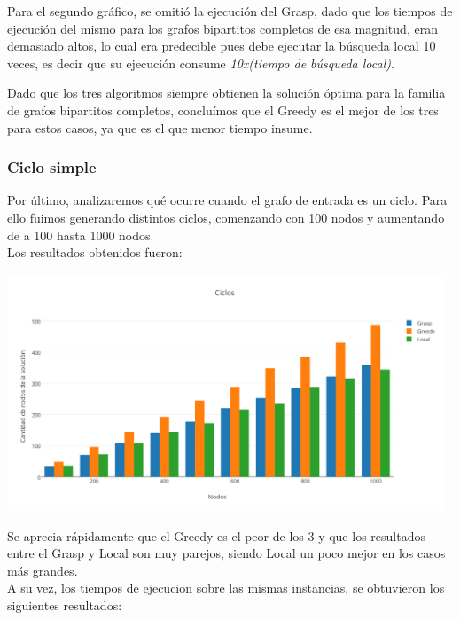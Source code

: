 Para el segundo gráfico, se omitió la ejecución del Grasp, dado que los tiempos de ejecución del mismo para los grafos bipartitos completos de esa magnitud, eran demasiado altos, 
lo cual era predecible pues debe ejecutar la b\'usqueda local 10 veces, es decir que su ejecuci\'on consume \textit{10x(tiempo de b\'usqueda local)}.


Dado que los tres algoritmos siempre obtienen la solución óptima para la familia de grafos bipartitos completos, concluímos que el Greedy es el mejor de los tres para estos casos, ya que es el que menor tiempo insume. 

\subsubsection{Ciclo simple}

Por \'ultimo, analizaremos qu\'e ocurre cuando el grafo de entrada es un ciclo. Para ello fuimos generando distintos ciclos, comenzando con 100 nodos y aumentando de a 100 hasta 1000 nodos.\\
Los resultados obtenidos fueron:\\

\begin{center}
 \includegraphics[width=13cm, keepaspectratio=yes]{imagenes/6/Ciclos.png}
\end{center}

Se aprecia r\'apidamente que el Greedy es el peor de los 3 y que los resultados entre el Grasp y Local son muy parejos, siendo Local un poco mejor en los casos m\'as grandes.\\

A su vez, los tiempos de ejecucion sobre las mismas instancias, se obtuvieron los siguientes resultados:


